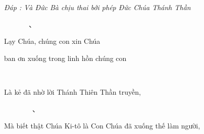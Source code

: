 \documentclass[12pt]{article}
\begin{document}
\begin{paracol}{2}
\begin{rightcolumn}
\textit{Đáp : Và Đức Bà chịu thai bởi phép Đức Chúa Thánh Thần}\\
\end{rightcolumn}

\begin{leftcolumn*}
\Large{\ \ \ \ \ \ \ 、}\\
\end{leftcolumn*}

\begin{rightcolumn}
Lạy Chúa, chúng con xin Chúa\\
\end{rightcolumn}

\begin{leftcolumn*}
\ \ \ \ \ \ \ \ \ }\\
\end{leftcolumn*}

\begin{rightcolumn}
ban ơn xuống trong linh hồn chúng con\\
\end{rightcolumn}

\begin{leftcolumn*}
\Large{\ \ \ \ \ \ \ }\\	
\end{leftcolumn*}

\begin{rightcolumn}
Là kẻ đã nhờ lời Thánh Thiên Thần truyền,\\
\end{rightcolumn}

\begin{leftcolumn*}
\Large{\ \ \ \ \ \ \ \ 、}\\	
\end{leftcolumn*}

\begin{rightcolumn}
Mà biết thật Chúa Ki-tô là Con Chúa đã xuống thế làm người,\\
\end{rightcolumn}


\end{paracol}
\end{document}
